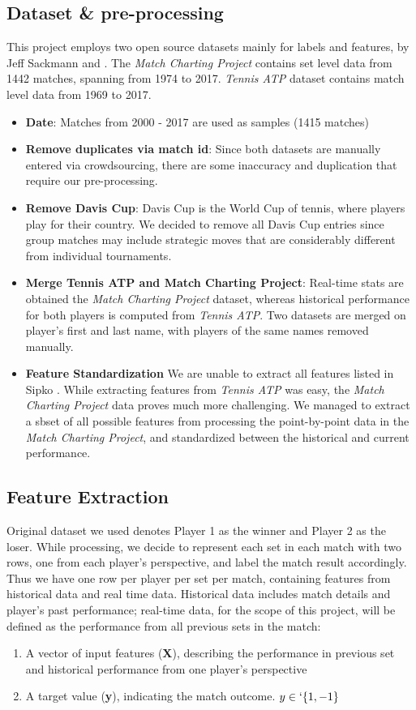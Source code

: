 \documentclass[paper=a4, fontsize=10pt]{scrartcl} %
\numberwithin{equation}{section} %
\numberwithin{figure}{section} %
\numberwithin{table}{section} %
\begin{document}
\subsection{Dataset \& pre-processing}
This project employs two open source datasets mainly for labels and features, by Jeff Sackmann \cite{tennis_atp} and \cite{tennis_charting}. The \textit{Match Charting Project} contains set level data from 1442 matches, spanning from 1974 to 2017. \textit{Tennis ATP} dataset contains match level data from 1969 to 2017.
\begin{itemize}
\item \textbf{Date}: Matches from 2000 - 2017 are used as samples (1415 matches)
\item \textbf{Remove duplicates via match id}: Since both datasets are manually entered via crowdsourcing, there are some inaccuracy and duplication that require our pre-processing.
\item \textbf{Remove Davis Cup}: Davis Cup is the World Cup of tennis, where players play for their country.  We decided to remove all Davis Cup entries since group matches may include strategic moves that are considerably different from individual tournaments.
\item \textbf{Merge Tennis ATP and Match Charting Project}: Real-time stats are obtained the \textit{Match Charting Project} dataset, whereas historical performance for both players is computed from \textit{Tennis ATP}. Two datasets are merged on player's first and last name, with players of the same names removed manually.
\item \textbf{Feature Standardization} We are unable to extract all features listed in Sipko \cite{tennis1}.  While extracting features from \textit{Tennis ATP} was easy, the \textit{Match Charting Project} data proves much more challenging.  We managed to extract a sbset of all possible features from processing the point-by-point data in the \textit{Match Charting Project}, and standardized between the historical and current performance.
\end{itemize}
\subsection{Feature Extraction}
\label{sec:label}
Original dataset we used denotes Player 1 as the winner and Player 2 as the loser. While processing, we decide to represent each set in each match with two rows, one from each player's perspective, and label the match result accordingly. Thus we have one row per player per set per match, containing features from historical data and real time data. Historical data includes match details and player's past performance; real-time data, for the scope of this project, will be defined as the performance from all previous sets in the match:
\begin{enumerate}
\item A vector of input features (\textbf{X}), describing the performance in previous set and historical performance from one player's perspective
\item A target value (\textbf{y}), indicating the match outcome. $y \in` \{1,-1\}$
\end{enumerate}
\end{document}
